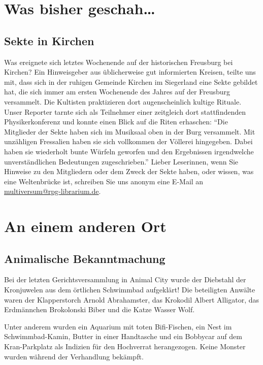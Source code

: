 \documentclass[final]{multiversum}
\begin{document}
\makemultititle
%

\section{Was bisher geschah\ldots}

\subsection{Sekte in Kirchen}
Was ereignete sich letztes Wochenende auf
der historischen Freusburg bei Kirchen? Ein Hinweisgeber aus üblicherweise gut
informierten Kreisen, teilte uns mit, dass sich in der ruhigen Gemeinde Kirchen
im Siegerland eine Sekte gebildet hat, die sich immer am ersten Wochenende des
Jahres auf der Freusburg versammelt. Die Kultisten praktizieren dort
augenscheinlich kultige Rituale. Unser Reporter tarnte sich als Teilnehmer einer
zeitgleich dort stattfindenden Physikerkonferenz und konnte einen Blick auf die
Riten erhaschen: \enquote{Die Mitglieder der Sekte haben sich im Musiksaal oben
in der Burg versammelt. Mit unzähligen Fressalien haben sie sich vollkommen der
Völlerei hingegeben. Dabei haben sie wiederholt bunte Würfeln geworfen und den
Ergebnissen irgendwelche unverständlichen Bedeutungen zugeschrieben.} Lieber
Leserinnen, wenn Sie Hinweise zu den Mitgliedern oder dem Zweck der Sekte
haben, oder wissen, was eine Weltenbrücke ist, schreiben Sie uns anonym eine
E-Mail an \url{multiversum@rpg-librarium.de}.

\section{An einem anderen Ort}

\subsection{Animalische Bekanntmachung}
Bei der letzten Gerichtsversammlung in Animal City wurde der Diebstahl der
Kronjuwelen aus dem örtlichen Schwimmbad aufgeklärt!  Die beteiligten Anwälte
waren der Klapperstorch Arnold Abrahamster, das Krokodil Albert Alligator, das
Erdmännchen Brokolonski Biber und die Katze Wasser Wolf.

Unter anderem wurden
ein Aquarium mit toten Bifi-Fischen, ein Nest im Schwimmbad-Kamin, Butter in
einer Handtasche und ein Bobbycar auf dem Kran-Parkplatz als Indizien für den
Hochverrat herangezogen.  Keine Monster wurden während der Verhandlung bekämpft.
\end{document}
